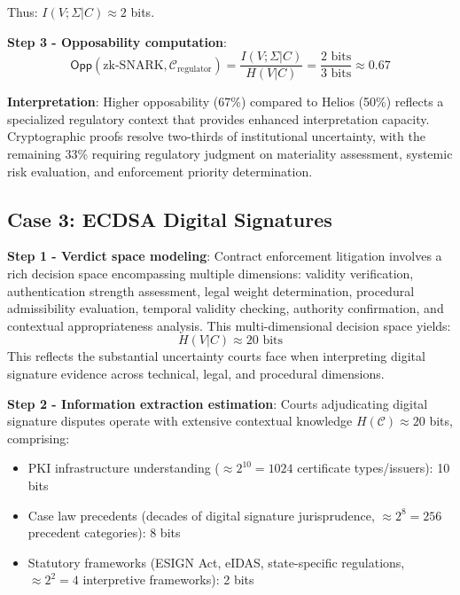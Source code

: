 \documentclass{ieeeaccess}
\begin{document}
Thus: $I(V;\Sigma|C) \approx 2$ bits.

\textbf{Step 3 - Opposability computation}:
\begin{equation}
\mathsf{Opp}(\text{zk-SNARK}, \mathcal{C}_{\text{regulator}}) = \frac{I(V;\Sigma|C)}{H(V|C)} = \frac{2 \text{ bits}}{3 \text{ bits}} \approx 0.67
\end{equation}

\textbf{Interpretation}: Higher opposability (67\%) compared to Helios (50\%) reflects a specialized regulatory context that provides enhanced interpretation capacity. Cryptographic proofs resolve two-thirds of institutional uncertainty, with the remaining 33\% requiring regulatory judgment on materiality assessment, systemic risk evaluation, and enforcement priority determination.

\subsection{Case 3: ECDSA Digital Signatures}\label{app:ecdsa}

\textbf{Step 1 - Verdict space modeling}: Contract enforcement litigation involves a rich 
decision space encompassing multiple dimensions: validity verification, authentication strength 
assessment, legal weight determination, procedural admissibility evaluation, temporal validity 
checking, authority confirmation, and contextual appropriateness analysis. This multi-dimensional 
decision space yields:
\begin{equation}
H(V|C) \approx 20 \text{ bits}
\end{equation}
This reflects the substantial uncertainty courts face when interpreting digital signature evidence 
across technical, legal, and procedural dimensions.


\textbf{Step 2 - Information extraction estimation}: Courts adjudicating digital signature disputes operate with extensive contextual knowledge $H(\mathcal{C}) \approx 20$ bits, comprising:
\begin{itemize}
\item PKI infrastructure understanding ($\approx 2^{10} = 1024$ certificate types/issuers): 10 bits
\item Case law precedents (decades of digital signature jurisprudence, $\approx 2^8 = 256$ precedent categories): 8 bits
\item Statutory frameworks (ESIGN Act, eIDAS, state-specific regulations, $\approx 2^2 = 4$ interpretive frameworks): 2 bits
\end{itemize}
\end{document}
